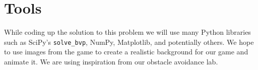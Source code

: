 \documentclass{article}
\begin{document}
\section{Tools}
While coding up the solution to this problem we will use many Python libraries such as SciPy's \texttt{solve\_bvp}, NumPy, Matplotlib, and potentially others. We hope to use images from the game to create a realistic background for our game and animate it. We are using inspiration from our obstacle avoidance lab.
\end{document}
